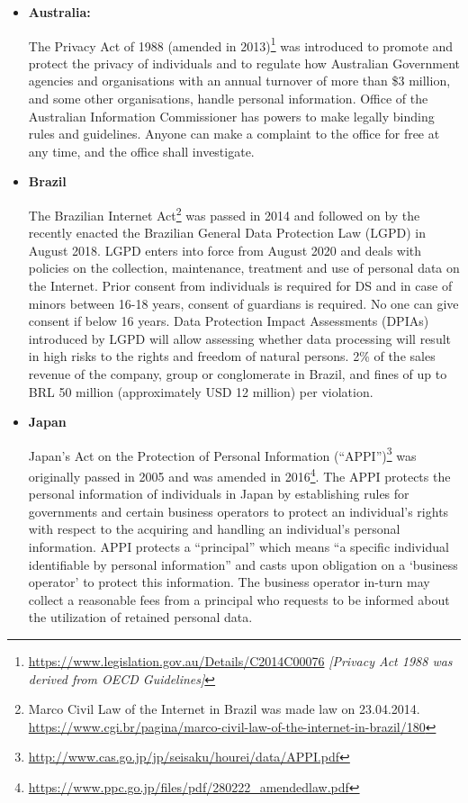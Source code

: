 \begin{multicols}{2}
\begin{itemize}
\item[{\bf 2.}] \textbf{Australia:}

The Privacy Act of 1988 (amended in 2013)\footnote{\url{https://www.legislation.gov.au/Details/C2014C00076} \textit{[Privacy Act 1988 was derived from OECD Guidelines]}} was introduced to promote and protect the privacy of individuals and to regulate how Australian Government agencies and organisations with an annual turnover of more than \$3 million, and some other organisations, handle personal information. Office of the Australian Information Commissioner has powers to make legally binding rules and guidelines. Anyone can make a complaint to the office for free at any time, and the office shall investigate.

\item[{\bf 3.}] \textbf{Brazil}

The Brazilian Internet Act\footnote{Marco Civil Law of the Internet in Brazil was made law on 23.04.2014. \url{https://www.cgi.br/pagina/marco-civil-law-of-the-internet-in-brazil/180}} was passed in 2014 and followed on by the recently enacted the Brazilian General Data Protection Law (LGPD) in August 2018. LGPD enters into force from August 2020 and deals with policies on the collection, maintenance, treatment and use of personal data on the Internet. Prior consent from individuals is required for DS and in case of minors between 16-18 years, consent of guardians is required. No one can give consent if below 16 years. Data Protection Impact Assessments (DPIAs) introduced by LGPD will allow assessing whether data processing will result in high risks to the rights and freedom of natural persons. 2\% of the sales revenue of the company, group or conglomerate in Brazil, and fines of up to BRL 50 million (approximately USD 12 million) per violation.

\item[{\bf 4.}] \textbf{Japan}

Japan’s Act on the Protection of Personal Information (“APPI”)\footnote{\url{http://www.cas.go.jp/jp/seisaku/hourei/data/APPI.pdf}} was originally passed in 2005 and was amended in 2016\footnote{\url{https://www.ppc.go.jp/files/pdf/280222\_amendedlaw.pdf}}. The APPI protects the personal information of individuals in Japan by establishing rules for governments and certain business operators to protect an individual’s rights with respect to the acquiring and handling an individual’s personal information. APPI protects a “principal” which means “a specific individual identifiable by personal information” and casts upon obligation on a ‘business operator’ to protect this information. The business operator in-turn may collect a reasonable fees from a principal who requests to be informed about the utilization of retained personal data.


\end{itemize}
\end{multicols}
